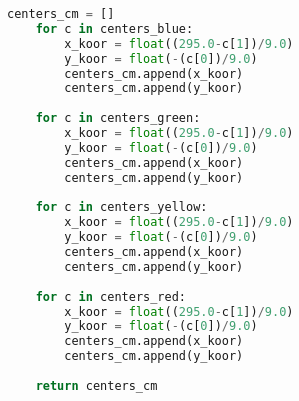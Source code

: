 \begin{lstlisting}[language=Python]
    centers_cm = []
    for c in centers_blue:
        x_koor = float((295.0-c[1])/9.0)
        y_koor = float(-(c[0])/9.0)
        centers_cm.append(x_koor)
        centers_cm.append(y_koor)
        
    for c in centers_green:
        x_koor = float((295.0-c[1])/9.0)
        y_koor = float(-(c[0])/9.0)
        centers_cm.append(x_koor)
        centers_cm.append(y_koor)
        
    for c in centers_yellow:
        x_koor = float((295.0-c[1])/9.0)
        y_koor = float(-(c[0])/9.0)
        centers_cm.append(x_koor)
        centers_cm.append(y_koor)
    
    for c in centers_red:
        x_koor = float((295.0-c[1])/9.0)
        y_koor = float(-(c[0])/9.0)
        centers_cm.append(x_koor)
        centers_cm.append(y_koor)
                          
    return centers_cm
\end{lstlisting}

